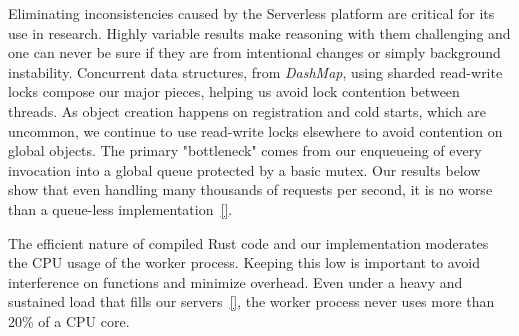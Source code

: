 Eliminating inconsistencies caused by the Serverless platform are critical for its use in research.
Highly variable results make reasoning with them challenging and one can never be sure if they are from intentional changes or simply background instability.
Concurrent data structures, from \emph{DashMap}, using sharded read-write locks compose our major pieces, helping us avoid lock contention between threads.
As object creation happens on registration and cold starts, which are uncommon, we continue to use read-write locks elsewhere to avoid contention on global objects.
The primary "bottleneck" comes from our enqueueing of every invocation into a global queue protected by a basic mutex.
Our results below show that even handling many thousands of requests per second, it is no worse than a queue-less implementation~\ref{}.

The efficient nature of compiled Rust code and our implementation moderates the CPU usage of the worker process.
Keeping this low is important to avoid interference on functions and minimize overhead.
Even under a heavy and sustained load that fills our servers~\ref{}, the \sysname{} worker process never uses more than 20\% of a CPU core.


